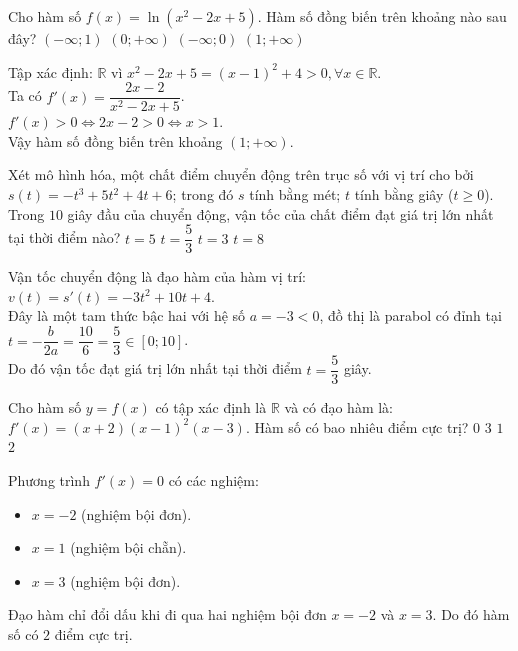 \begin{ex}
Cho hàm số $f(x) = \ln(x^2 - 2x + 5)$. Hàm số đồng biến trên khoảng nào sau đây?
\choice
{$(-\infty; 1)$}
{$(0; +\infty)$}
{$(-\infty; 0)$}
{\True $(1; +\infty)$}
\begin{loigiai}
Tập xác định: $\mathbb{R}$ vì $x^2 - 2x + 5 = (x-1)^2 + 4 > 0, \forall x \in \mathbb{R}$.\\
Ta có $f'(x) = \dfrac{2x - 2}{x^2 - 2x + 5}$.\\
$f'(x) > 0 \Leftrightarrow 2x - 2 > 0 \Leftrightarrow x > 1$.\\
Vậy hàm số đồng biến trên khoảng $(1; +\infty)$.
\end{loigiai}
\end{ex}

\begin{ex}
Xét mô hình hóa, một chất điểm chuyển động trên trục số với vị trí cho bởi $s(t) = -t^3 + 5t^2 + 4t + 6$; trong đó $s$ tính bằng mét; $t$ tính bằng giây ($t \ge 0$). Trong $10$ giây đầu của chuyển động, vận tốc của chất điểm đạt giá trị lớn nhất tại thời điểm nào?
\choice
{$t = 5$}
{\True $t = \dfrac{5}{3}$}
{$t = 3$}
{$t = 8$}
\begin{loigiai}
Vận tốc chuyển động là đạo hàm của hàm vị trí:
$v(t) = s'(t) = -3t^2 + 10t + 4$.\\
Đây là một tam thức bậc hai với hệ số $a = -3 < 0$, đồ thị là parabol có đỉnh tại $t = -\dfrac{b}{2a} = \dfrac{10}{6} = \dfrac{5}{3} \in [0; 10]$.\\
Do đó vận tốc đạt giá trị lớn nhất tại thời điểm $t = \dfrac{5}{3}$ giây.
\end{loigiai}
\end{ex}

\begin{ex}
Cho hàm số $y = f(x)$ có tập xác định là $\mathbb{R}$ và có đạo hàm là: $f'(x) = (x+2)(x-1)^2(x-3)$. Hàm số có bao nhiêu điểm cực trị?
\choice
{$0$}
{$3$}
{$1$}
{\True $2$}
\begin{loigiai}
Phương trình $f'(x) = 0$ có các nghiệm:
\begin{itemize}
    \item $x = -2$ (nghiệm bội đơn).
    \item $x = 1$ (nghiệm bội chẵn).
    \item $x = 3$ (nghiệm bội đơn).
\end{itemize}
Đạo hàm chỉ đổi dấu khi đi qua hai nghiệm bội đơn $x = -2$ và $x = 3$. Do đó hàm số có $2$ điểm cực trị.
\end{loigiai}
\end{ex}

